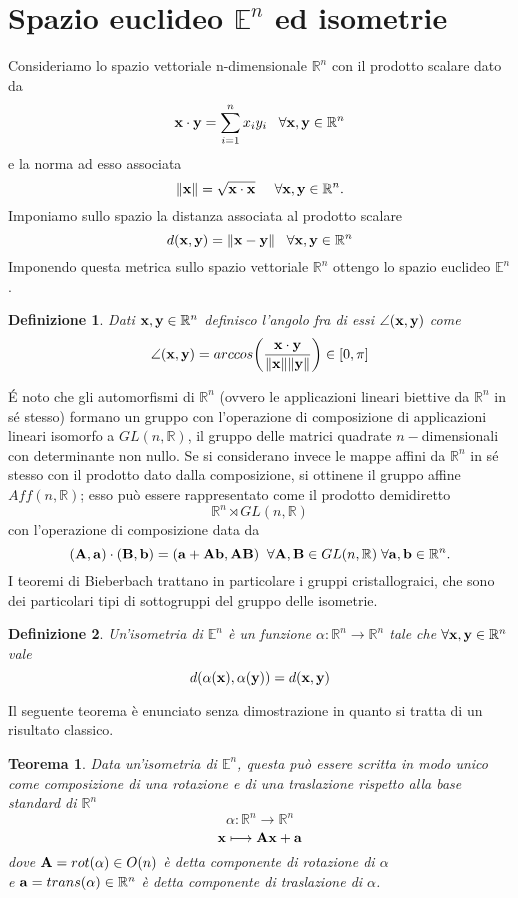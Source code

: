 \documentclass[12pt,a4paper]{book}
\newtheorem{definition}{Definizione}[section]
\newtheorem{theorem}{Teorema}[section]
\begin{document}
\section{Spazio euclideo $\mathbb{E}^n$ ed isometrie}
Consideriamo lo spazio vettoriale n-dimensionale $\mathbb{R}^{n}$  con il prodotto scalare dato da 
\[
  \vb{x} \cdot \vb{y} =  \sum_{i=1}^{n} x_i y_i    \; \; \; \forall \vb{x} , \vb{y} \in \mathbb{R}^{n}
\]
e la norma ad esso associata              
\[
  \norm{\vb{x}} =  \sqrt{\vb{x} \cdot \vb{x}}     \; \; \; \; \; \forall \vb{x} , \vb{y} \in \mathbb{R}^{n}.
\]
Imponiamo sullo spazio la distanza associata al prodotto scalare 
\[ d(\vb{x}, \vb{y} ) = \norm{\vb{x-y}}           \; \; \; \forall \vb{x} , \vb{y} \in \mathbb{R}^{n}\] 
Imponendo questa metrica sullo spazio vettoriale $\mathbb{R}^n$ ottengo lo spazio euclideo $\mathbb{E}^n$. 
\begin{definition}
Dati $\vb{x, y} \in \mathbb{R}^n$ definisco l'angolo fra di essi $\angle (\vb{x},\vb{y})$ come 
\[ \angle (\vb{x},\vb{y}) = arccos \bigg( \frac{\vb{x} \cdot \vb{y}}{\norm{\vb{x}} \norm{\vb{y}}} \bigg) \in [0, \pi] \]
\end{definition} 
\'E noto che gli automorfismi di $\mathbb{R}^n$ (ovvero le applicazioni lineari biettive da $\mathbb{R}^n$ in sé stesso) formano un gruppo con l'operazione di composizione di applicazioni lineari isomorfo  a $ GL(n, \mathbb{R}) $, il gruppo delle matrici quadrate $n-$dimensionali con determinante non nullo. 
Se si considerano invece le mappe affini da $\mathbb{R}^n$ in sé stesso con il prodotto dato dalla composizione, si ottinene il gruppo affine $Aff(n, \mathbb{R})$; esso può essere rappresentato come il prodotto demidiretto 
\[  \mathbb{R}^{n} \rtimes GL(n, \mathbb{R})   \]
con l'operazione di composizione data da 
\[ (\vb{A, a}) \cdot (\vb{B, b}) = (\vb{ a + Ab, AB})  \; \; \forall \vb{A, B}  \in  GL(n, \mathbb{R}) \; \forall \vb{a, b} \in \mathbb{R}^n. \]
I teoremi di Bieberbach trattano in particolare i gruppi cristallograici, che sono dei particolari tipi di sottogruppi del gruppo delle isometrie.
\begin{definition}
	Un'isometria di $\mathbb{E}^n$  è un funzione $ \alpha : \mathbb{R}^{n} \longrightarrow \mathbb{R}^{n} $  tale che $\forall \vb{x,y} \in \mathbb{R}^n $ vale 
	\[ d(\alpha(\vb{x}), \alpha(\vb{y})) = d(\vb{x} , \vb{y} )\]
\end{definition} 
Il seguente teorema è enunciato senza dimostrazione in quanto si tratta di un risultato classico. 
\begin{theorem}
Data un'isometria di $\mathbb{E}^n $, questa può essere scritta in modo unico come composizione di una rotazione e di una traslazione rispetto alla base standard di $\mathbb{R}^n$
\[ \alpha : \mathbb{R}^{n} \longrightarrow \mathbb{R}^{n} \]
\[\vb{x} \longmapsto \vb{Ax + a} \]
dove $\vb{A} = rot( \alpha ) \in O(n) $ è detta componente di rotazione di $\alpha$ \\
e $\vb{a} = trans( \alpha ) \in \mathbb{R}^{n} $ è detta componente di traslazione di $\alpha$. 
\end{theorem}
\end{document}
